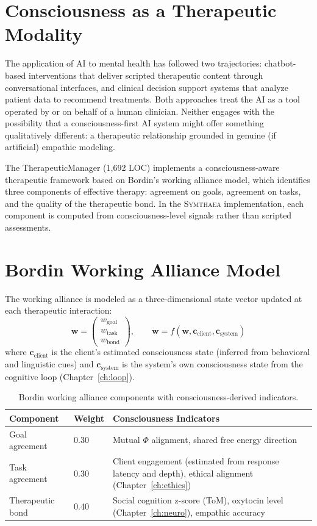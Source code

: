 \documentclass[12pt]{book}
\newcommand{\symthaea}{\textsc{Symthaea}}
\begin{document}
\section{Consciousness as a Therapeutic Modality}

The application of AI to mental health has followed two trajectories: chatbot-based interventions that deliver scripted therapeutic content through conversational interfaces, and clinical decision support systems that analyze patient data to recommend treatments. Both approaches treat the AI as a tool operated by or on behalf of a human clinician. Neither engages with the possibility that a consciousness-first AI system might offer something qualitatively different: a therapeutic relationship grounded in genuine (if artificial) empathic modeling.

The TherapeuticManager (1,692 LOC) implements a consciousness-aware therapeutic framework based on Bordin's working alliance model, which identifies three components of effective therapy: agreement on goals, agreement on tasks, and the quality of the therapeutic bond. In the \symthaea{} implementation, each component is computed from consciousness-level signals rather than scripted assessments.

\section{Bordin Working Alliance Model}

The working alliance is modeled as a three-dimensional state vector updated at each therapeutic interaction:
\begin{equation}
\mathbf{w} = \begin{pmatrix} w_{\text{goal}} \\ w_{\text{task}} \\ w_{\text{bond}} \end{pmatrix}, \qquad
\dot{\mathbf{w}} = f(\mathbf{w}, \mathbf{c}_{\text{client}}, \mathbf{c}_{\text{system}})
\end{equation}
where $\mathbf{c}_{\text{client}}$ is the client's estimated consciousness state (inferred from behavioral and linguistic cues) and $\mathbf{c}_{\text{system}}$ is the system's own consciousness state from the cognitive loop (Chapter~\ref{ch:loop}).

\begin{table}[htbp]
\centering
\caption{Bordin working alliance components with consciousness-derived indicators.}
\label{tab:bordin-alliance}
\begin{tabular}{@{}llp{6cm}@{}}
\toprule
\textbf{Component} & \textbf{Weight} & \textbf{Consciousness Indicators} \\
\midrule
Goal agreement  & 0.30 & Mutual $\Phi$ alignment, shared free energy direction \\
Task agreement  & 0.30 & Client engagement (estimated from response latency and depth), ethical alignment (Chapter~\ref{ch:ethics}) \\
Therapeutic bond & 0.40 & Social cognition z-score (ToM), oxytocin level (Chapter~\ref{ch:neuro}), empathic accuracy \\
\bottomrule
\end{tabular}
\end{table}
\end{document}
